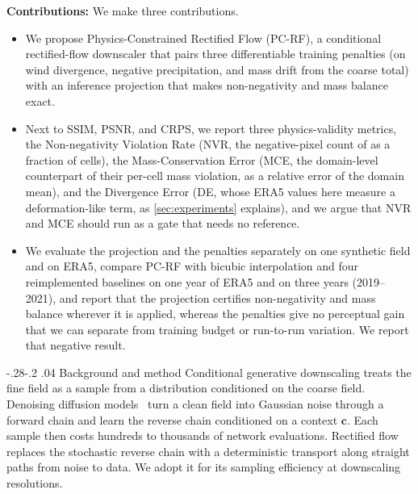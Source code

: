 \documentclass[sigconf,nonacm]{acmart}
\makeatletter
\newcommand{\bc}{\mathbf{c}}
\newcommand{\pcrf}{\textsc{PC-RF}\xspace}
\renewcommand\section{\def\@toclevel{1}%
  \@startsection{section}{1}{\z@}%
  {-.28\baselineskip \@plus -1\p@ \@minus -.2\p@}%
  {.04\baselineskip}%
  {\ACM@NRadjust\@secfont}}
\makeatother
\begin{document}
\noindent\textbf{Contributions:} We make three contributions.
{\setlength{\topsep}{0pt}\setlength{\partopsep}{0pt}\setlength{\itemsep}{0pt}\setlength{\parsep}{0pt}\setlength{\parskip}{0pt}
\begin{itemize}
\item We propose Physics-Constrained Rectified Flow (\pcrf), a conditional rectified-flow downscaler that pairs three differentiable training penalties (on wind divergence, negative precipitation, and mass drift from the coarse total) with an inference projection that makes non-negativity and mass balance exact.
\item Next to SSIM, PSNR, and CRPS, we report three physics-validity metrics, the Non-negativity Violation Rate (NVR, the negative-pixel count of \citet{harder2023hard} as a fraction of cells), the Mass-Conservation Error (MCE, the domain-level counterpart of their per-cell mass violation, as a relative error of the domain mean), and the Divergence Error (DE, whose ERA5 values here measure a deformation-like term, as \cref{sec:experiments} explains), and we argue that NVR and MCE should run as a gate that needs no reference.
\item We evaluate the projection and the penalties separately on one synthetic field and on ERA5, compare \pcrf with bicubic interpolation and four reimplemented baselines on one year of ERA5 and on three years (2019--2021), and report that the projection certifies non-negativity and mass balance wherever it is applied, whereas the penalties give no perceptual gain that we can separate from training budget or run-to-run variation. We report that negative result.
\end{itemize}}

\section{Background and method}
\label{sec:background}
Conditional generative downscaling treats the fine field as a sample from a distribution conditioned on the coarse field. Denoising diffusion models~\citep{ho2020denoising,song2021score} turn a clean field into Gaussian noise through a forward chain and learn the reverse chain conditioned on a context $\bc$. Each sample then costs hundreds to thousands of network evaluations. Rectified flow~\citep{liu2022flow,lipman2022flow} replaces the stochastic reverse chain with a deterministic transport along straight paths from noise to data. We adopt it for its sampling efficiency at downscaling resolutions.
\end{document}
